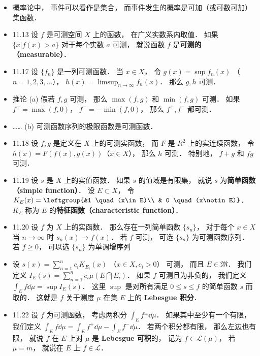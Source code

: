 \begin{itemize}
\item 概率论中， 事件可以看作是集合， 而事件发生的概率是可加（或可数可加）集函数．

\item 11.13 设 $f$ 是可测空间 $X$ 上的函数， 在广义实数系内取值． 如果 $\{x|f(x)>a\}$ 对于每个实数 $a$ 可测， 就说函数 $f$ 是\textbf{可测的（measurable）}．

\item 11.17 设 $\{f_n\}$ 是一列可测函数． 当 $x\in X$， 令 $g(x)=\sup f_n(x)$ （$n=1,2,3,\dots$）， $h(x)=\limsup_{n\to\infty} f_n(x)$． 那么 $g,h$ 可测．

\item 推论 (a) 假若 $f,g$ 可测， 那么 $\max(f,g)$ 和 $\min(f,g)$ 可测． 如果 $f^+=\max(f,0)$， $f^-=-\min(f,0)$， 那么 $f^+,f^-$ 都可测．

\item …… (b) 可测函数序列的极限函数是可测函数．

\item 11.18 设 $f,g$ 是定义在 $X$ 上的可测实函数， 而 $F$ 是 $R^2$ 上的实连续函数， 令 $h(x)=F(f(x),g(x))$（$x\in X$）， 那么 $h$ 可测． 特别地， $f+g$ 和 $fg$ 可测．

\item 11.19 设 $s$ 是 $X$ 上的实值函数． 如果 $s$ 的值域是有限集， 就说 $s$ 为\textbf{简单函数（simple function）}． 设 $E\subset X$， 令 $K_E(x)=\leftgroup{&1 \quad  (x\in E)\\ & 0 \quad (x\notin E)}$． $K_E$ 称为 $E$ 的\textbf{特征函数（characteristic function）}．

\item 11.20 设 $f$ 为 $X$ 上的实函数． 那么存在一列简单函数 $\{s_n\}$， 对于每个 $x\in X$ 当 $n\to\infty$ 时 $s_n(x)\to f(x)$． 若 $f$ 可测， 可选 $\{s_n\}$ 为可测函数序列． 若 $f\geqslant 0$， 可以选 $\{s_n\}$ 为单调增序列

\item 设 $s(x) = \sum_{n=1}^n c_i K_{E_i}(x)$ （$x\in X, c_i>0$） 可测， 而且 $E\in \mathfrak M$． 我们定义 $I_E(s) = \sum_{n=1}^n c_i \mu(E\bigcap E_i)$． 如果 $f$ 可测且为非负的， 我们定义 $\int_E f\dd{\mu} = \sup I_E(s)$． 这里 $\sup$ 是对所有满足 $0\leqslant s\leqslant f$ 的简单函数 $s$ 而取的． 这就是 $f$ 关于测度 $\mu$ 在集 $E$ 上的 \textbf{Lebesgue 积分}．

\item 11.22 设 $f$ 为可测函数， 考虑两积分 $\int_E f^\pm \dd{\mu}$． 如果其中至少有一个有限， 我们定义 $\int_E f\dd{\mu} = \int_E f^+\dd{\mu} - \int_E f^-\dd{\mu}$． 若两个积分都有限， 那么左边也有限， 就说 $f$ 在 $E$ 上对 $\mu$ 是 \textbf{Lebesgue 可积}的， 记为 $f\in \mathscr L(\mu)$， 若 $\mu=m$， 就说在 $E$ 上 $f\in \mathscr L$．
\end{itemize}
